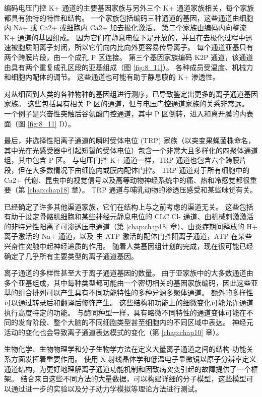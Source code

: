 编码电压门控 K+ 通道的主要基因家族与另外三个 K+ 通道家族相关，每个家族都具有独特的特性和结构。 
一个家族包括编码三种通道的基因，这些通道由细胞内 Na+ 或 Ca2+ 或细胞内 Ca2+ 加去极化激活。 
第二个家族由编码内向整流 K+ 通道的基因组成。 
因为它们在静息电位下是开放的，并且在去极化过程中迅速被胞质阳离子封闭，所以它们向内比向外更容易传导离子。 
每个通道亚基只有两个跨膜片段，由一个成孔 P 区连接。 
第三个基因家族编码 K2P 通道，该通道由具有两个重复成孔区段的亚基组成（图 \ref{fig:8_11}）。 
各种成员受温度、机械力和细胞内配体的调节。 
这些通道也可能有助于静息膜的 K+ 渗透性。


对从细菌到人类的各种物种的基因组进行测序，已导致鉴定出更多的离子通道基因家族。 
这些包括具有相关 P 区的通道，但与电压门控通道家族的关系非常远。 
一个例子是兴奋性突触后谷氨酸门控通道，其中 P 区倒转，进入和离开膜的内表面（图 \ref{fig:8_11} D）。


最后，非选择性阳离子通道的瞬时受体电位 (TRP) 家族（以突变果蝇菌株命名，其中光在光感受器中引起短暂的受体电位）包含一个非常大且多样化的四聚体通道组，其中包含 P 区。 
与电压门控 K+ 通道一样，TRP 通道也包含六个跨膜片段，但在大多数情况下由细胞内或膜内配体门控。 
TRP 通道对于所有细胞中的 Ca2+ 代谢、昆虫中的视觉信号以及高等动物神经系统中的痛、热和冷感觉都很重要（第 \ref{chap:chap18} 章）。 
TRP 通道与哺乳动物的渗透压感受和某些味觉有关。


已经确定了许多其他渠道家族，它们在结构上与之前考虑的渠道无关。 
这些包括有助于设定骨骼肌细胞和某些神经元静息电位的 CLC Cl- 通道、由机械刺激激活的非特异性阳离子可渗透压电通道（第 \ref{chap:chap18} 章）、由炎症期间释放的 H+ 离子激活的 Na+ 通道，以及 由 ATP 激活的配体门控阳离子通道，ATP 在某些兴奋性突触中起神经递质的作用。 
随着人类基因组计划的完成，现在很可能已经确定了几乎所有主要类型的离子通道基因。


离子通道的多样性甚至大于离子通道基因的数量。 
由于亚家族中的大多数通道由多个亚基组成，其中每种类型都可能由一个密切相关的基因家族编码，因此这些亚基的组合排列可以产生具有不同功能特性的多种异源多聚体通道。 
额外的多样性可以通过转录后和翻译后修饰产生。 
这些结构和功能上的细微变化可能允许通道执行高度特定的功能。 
与酶同种型一样，具有略微不同特性的通道变体可能在不同的发育阶段、整个大脑的不同细胞类型甚至细胞内的不同区域中表达。 神经元活动的变化也会导致离子通道表达模式的变化（第 \ref{chap:chap10} 章）。


生物化学、生物物理学和分子生物学方法在定义大量离子通道之间的结构-功能关系方面发挥着重要作用。 
使用 X 射线晶体学和低温电子显微镜以原子分辨率定义通道结构，为更好地理解离子通道功能机制和因致病突变引起的故障提供了一个框架。 
结合来自这些不同方法的大量数据，可以构建详细的分子模型，这些模型可以通过进一步的实验以及分子动力学模拟等理论方法进行测试。





